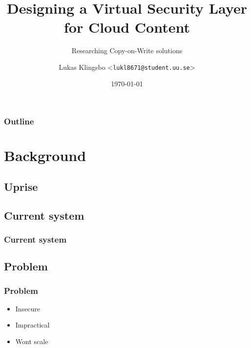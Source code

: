 \documentclass{beamer}
\title{Designing a Virtual Security Layer for Cloud Content}
\subtitle{Researching Copy-on-Write solutions}
\author[Lukas Klingsbo | \emph{lukl8671@student.uu.se}] %
{Lukas Klingsbo <\texttt{lukl8671@student.uu.se}>}
\institute[Dept.\ of Information Technology]%
{Department of Information Technology\\Uppsala University}
\date[]
{\today}
\begin{document}
\begin{frame}[plain] %
  \titlepage
\end{frame}

\begin{frame}
    \frametitle{Outline}
    \setcounter{tocdepth}{2}
    \tableofcontents[]
\end{frame}

\section{Background}

\subsection{Uprise}
\begin{frame}
  \frametitle{}
  \centerline{}
  \vspace{30pt}
  \centerline{}
  \vspace{10pt}
  \centerline{}
  \vspace{10pt}
  \centerline{}
\end{frame}

\subsection{Current system}
\begin{frame}
  \frametitle{Current system}
  \centerline{}
\end{frame}

\subsection{Problem}
\begin{frame}
  \frametitle{Problem}
  \begin{itemize}
    \item{Insecure}
    \pause
    \item{Impractical}
    \pause
    \item{Wont scale}
  \end{itemize}
\end{frame}
\end{document}
